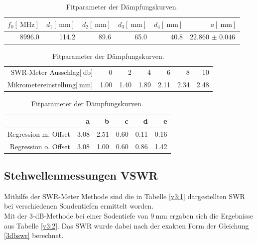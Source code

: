 \begin{table}
\centering
\caption{Messwerte zur Bestimmung der Klystronfrequenz.}
\begin{tabular}{r r r r r r}
	$f_\text{0}[\SI{}{\mega\hertz}]$ & $d_\text{1}[\SI{}{\milli\meter}]$ & $d_\text{2}[\SI{}{\milli\meter}]$ & $d_\text{3}[\SI{}{\milli\meter}]$ & $d_\text{4}[\SI{}{\milli\meter}]$ & $a[\SI{}{\milli\meter}]$\\
	\hline
	\hline
	8996.0 & 114.2 & 89.6 & 65.0 & 40.8 & $\SI{22.860(46)}{}$\\
	\hline
\end{tabular}
\label{v2:1}
\caption{Messwerte zur Bestimmung Dämpfungskurve.}
\begin{tabular}{r|r r r r r r|}
	SWR-Meter Ausschlag[$\SI{}{\decibel}$] & 0 & 2 & 4 & 6 & 8 & 10\\
	Mikrometereinstellung[$\SI{}{\milli\meter}$] & 1.00 & 1.40 & 1.89 & 2.11 & 2.34 & 2.48\\
\end{tabular}
\label{v2:2}
\caption{Fitparameter der Dämpfungskurven.}
\begin{tabular}{r r r r r r}
	 & a & b & c & d & e\\
	\hline
	\hline
	Regression m. Offset & 3.08 & 2.51 & 0.60 & 0.11 & 0.16\\
	Regression o. Offset & 3.08 & 1.00 & 0.60 & 0.86 & 1.42\\
	\hline
\end{tabular}
\label{v2:3}
\end{table}

\FloatBarrier

\subsection{Stehwellenmessungen VSWR} %
\label{sec:stehwellenmessungen_vswr}

Mithilfe der SWR-Meter Methode sind die in Tabelle \ref{v3:1} dargestellten SWR bei verschiedenen Sondentiefen ermittelt worden.\\

Mit der 3-dB-Methode bei einer Sodentiefe von $\SI{9}{\milli\meter}$ ergaben sich die Ergebnisse aus Tabelle \ref{v3:2}.
Das SWR wurde dabei nach der exakten Form der Gleichung \eqref{3dbswr} berechnet.\\

